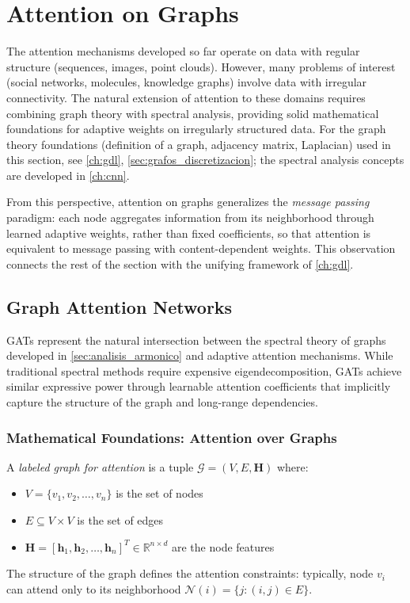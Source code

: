 \section{Attention on Graphs}

The attention mechanisms developed so far operate on data with regular structure (sequences, images, point clouds). However, many problems of interest (social networks, molecules, knowledge graphs) involve data with irregular connectivity. The natural extension of attention to these domains requires combining graph theory with spectral analysis, providing solid mathematical foundations for adaptive weights on irregularly structured data. For the graph theory foundations (definition of a graph, adjacency matrix, Laplacian) used in this section, see \autoref{ch:gdl}, \autoref{sec:grafos_discretizacion}; the spectral analysis concepts are developed in \autoref{ch:cnn}.

From this perspective, attention on graphs generalizes the \textit{message passing} paradigm: each node aggregates information from its neighborhood through learned adaptive weights, rather than fixed coefficients, so that attention is equivalent to message passing with content-dependent weights. This observation connects the rest of the section with the unifying framework of \autoref{ch:gdl}.

\subsection{Graph Attention Networks}\label{subsec:graph_attention_networks}\label{sec:graph_attention}

\glspl{GAT} represent the natural intersection between the spectral theory of graphs developed in \autoref{sec:analisis_armonico} and adaptive attention mechanisms. While traditional spectral methods require expensive eigendecomposition, \glspl{GAT} achieve similar expressive power through learnable attention coefficients that implicitly capture the structure of the graph and long-range dependencies.

\subsubsection{Mathematical Foundations: Attention over Graphs}\label{subsubsec:fundamentos_atencion_grafos}

\begin{definition}\label{def:labeled_graph_attention}
A \textit{labeled graph for attention} is a tuple $\mathcal{G} = (V, E, \mathbf{H})$ where:
\begin{itemize}
    \item $V = \{v_1, v_2, \ldots, v_n\}$ is the set of nodes
    \item $E \subseteq V \times V$ is the set of edges
    \item $\mathbf{H} = [\mathbf{h}_1, \mathbf{h}_2, \ldots, \mathbf{h}_n]^T \in \mathbb{R}^{n \times d}$ are the node features
\end{itemize}
The structure of the graph defines the attention constraints: typically, node $v_i$ can attend only to its neighborhood $\mathcal{N}(i) = \{j : (i,j) \in E\}$.
\end{definition}

